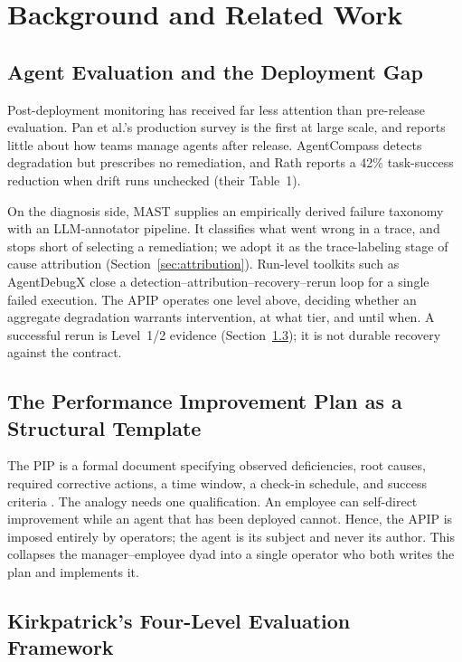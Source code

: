\documentclass[conference]{IEEEtran}
\begin{document}
\section{Background and Related Work}

\subsection{Agent Evaluation and the Deployment Gap}

Post-deployment monitoring has received far less attention than pre-release
evaluation. Pan et al.'s production survey \cite{pan2025} is the first at large
scale, and reports little about how teams manage agents after release.
AgentCompass \cite{kartik2025} detects degradation but prescribes no
remediation, and Rath \cite{rath2026} reports a 42\% task-success reduction
when drift runs unchecked (their Table~1).

On the diagnosis side, MAST \cite{cemri2025} supplies an empirically derived
failure taxonomy with an LLM-annotator pipeline. It classifies what went wrong
in a trace, and stops short of selecting a remediation; we adopt it as the
trace-labeling stage of cause attribution (Section~\ref{sec:attribution}).
Run-level toolkits such as AgentDebugX \cite{zhu2026} close a
detection--attribution--recovery--rerun loop for a single failed execution. The
APIP operates one level above, deciding whether an aggregate degradation
warrants intervention, at what tier, and until when. A successful rerun is
Level~1/2 evidence (Section~\ref{sec:kirkpatrick}); it is not durable recovery
against the contract.

\subsection{The Performance Improvement Plan as a Structural Template}
\label{sec:pip}

The PIP is a formal document specifying observed deficiencies, root causes,
required corrective actions, a time window, a check-in schedule, and success
criteria \cite{shrm2023}.
The analogy needs one qualification. An employee can self-direct improvement while 
an agent that has been deployed cannot. Hence, the APIP is imposed entirely by operators;
the agent is its subject and never its author. This collapses the manager--employee
dyad into a single operator who both writes the plan and implements it.

\subsection{Kirkpatrick's Four-Level Evaluation Framework}
\label{sec:kirkpatrick}
\end{document}
